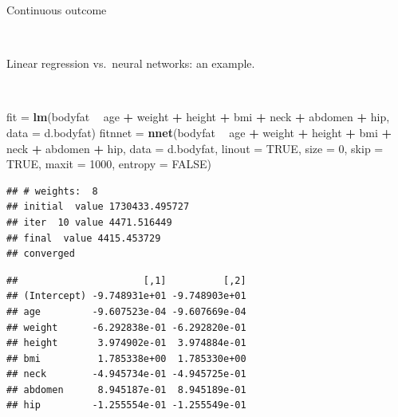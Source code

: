 \documentclass[10pt,ignorenonframetext,]{beamer}
\newenvironment{Shaded}{\begin{snugshade}}{\end{snugshade}}
\newcommand{\DataTypeTok}[1]{\textcolor[rgb]{0.13,0.29,0.53}{#1}}
\newcommand{\DecValTok}[1]{\textcolor[rgb]{0.00,0.00,0.81}{#1}}
\newcommand{\KeywordTok}[1]{\textcolor[rgb]{0.13,0.29,0.53}{\textbf{#1}}}
\newcommand{\NormalTok}[1]{#1}
\newcommand{\OperatorTok}[1]{\textcolor[rgb]{0.81,0.36,0.00}{\textbf{#1}}}
\newcommand{\OtherTok}[1]{\textcolor[rgb]{0.56,0.35,0.01}{#1}}
\newcommand{\StringTok}[1]{\textcolor[rgb]{0.31,0.60,0.02}{#1}}
\begin{document}
\begin{frame}[fragile]

\begin{block}{Continuous outcome}

\(~\)

Linear regression vs.~neural networks: an example.

\(~\)

\scriptsize

\begin{Shaded}
\begin{Highlighting}[]
\NormalTok{fit =}\StringTok{ }\KeywordTok{lm}\NormalTok{(bodyfat }\OperatorTok{~}\StringTok{ }\NormalTok{age }\OperatorTok{+}\StringTok{ }\NormalTok{weight }\OperatorTok{+}\StringTok{ }\NormalTok{height }\OperatorTok{+}\StringTok{ }\NormalTok{bmi }\OperatorTok{+}\StringTok{ }\NormalTok{neck }\OperatorTok{+}\StringTok{ }\NormalTok{abdomen }\OperatorTok{+}\StringTok{ }\NormalTok{hip, }
    \DataTypeTok{data =}\NormalTok{ d.bodyfat)}
\NormalTok{fitnnet =}\StringTok{ }\KeywordTok{nnet}\NormalTok{(bodyfat }\OperatorTok{~}\StringTok{ }\NormalTok{age }\OperatorTok{+}\StringTok{ }\NormalTok{weight }\OperatorTok{+}\StringTok{ }\NormalTok{height }\OperatorTok{+}\StringTok{ }\NormalTok{bmi }\OperatorTok{+}\StringTok{ }\NormalTok{neck }\OperatorTok{+}\StringTok{ }\NormalTok{abdomen }\OperatorTok{+}\StringTok{ }
\StringTok{    }\NormalTok{hip, }\DataTypeTok{data =}\NormalTok{ d.bodyfat, }\DataTypeTok{linout =} \OtherTok{TRUE}\NormalTok{, }\DataTypeTok{size =} \DecValTok{0}\NormalTok{, }\DataTypeTok{skip =} \OtherTok{TRUE}\NormalTok{, }\DataTypeTok{maxit =} \DecValTok{1000}\NormalTok{, }
    \DataTypeTok{entropy =} \OtherTok{FALSE}\NormalTok{)}
\end{Highlighting}
\end{Shaded}

\begin{verbatim}
## # weights:  8
## initial  value 1730433.495727 
## iter  10 value 4471.516449
## final  value 4415.453729 
## converged
\end{verbatim}

\begin{Shaded}
\end{Shaded}

\begin{verbatim}
##                      [,1]          [,2]
## (Intercept) -9.748931e+01 -9.748903e+01
## age         -9.607523e-04 -9.607669e-04
## weight      -6.292838e-01 -6.292820e-01
## height       3.974902e-01  3.974884e-01
## bmi          1.785338e+00  1.785330e+00
## neck        -4.945734e-01 -4.945725e-01
## abdomen      8.945187e-01  8.945189e-01
## hip         -1.255554e-01 -1.255549e-01
\end{verbatim}

\end{block}

\end{frame}
\end{document}
